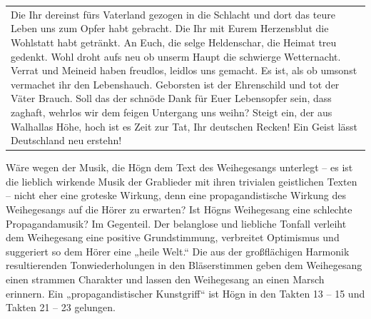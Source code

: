 \documentclass[a4paper]{article}
\begin{document}
\begin{center}
\tablefirsthead{}
\tablehead{}
\tabletail{}
\tablelasttail{}
\begin{supertabular}{m{8.761001cm}}
Die Ihr dereinst fürs Vaterland gezogen in die Schlacht\newline
und dort das teure Leben uns zum Opfer habt gebracht.\newline
Die Ihr mit Eurem Herzensblut die Wohlstatt habt getränkt.\newline
An Euch, die selge Heldenschar, die Heimat treu gedenkt.\newline
\newline
Wohl droht aufs neu ob unserm Haupt die schwierge Wetternacht.\newline
Verrat und Meineid haben freudlos, leidlos uns gemacht.\newline
Es ist, als ob umsonst vermachet ihr den Lebenshauch.\newline
Geborsten ist der Ehrenschild und tot der Väter Brauch.\newline
\newline
Soll das der schnöde Dank für Euer Lebensopfer sein,\newline
dass zaghaft, wehrlos wir dem feigen Untergang uns weihn?\newline
Steigt ein, der aus Walhallas Höhe, hoch ist es Zeit zur Tat,\newline
Ihr deutschen Recken! Ein Geist lässt Deutschland neu erstehn!\\
\end{supertabular}
\end{center}
Wäre wegen der Musik, die Högn dem Text des Weihegesangs unterlegt – es
ist die lieblich wirkende Musik der Grablieder mit ihren trivialen
geistlichen Texten – nicht eher eine groteske Wirkung, denn eine
propagandistische Wirkung des Weihegesangs auf die Hörer zu erwarten?
Ist Högns Weihegesang eine schlechte Propagandamusik? Im Gegenteil. Der
belanglose und liebliche Tonfall verleiht dem Weihegesang eine positive
Grundstimmung, verbreitet Optimismus und suggeriert so dem Hörer eine
„heile Welt.“ Die aus der großflächigen Harmonik resultierenden
Tonwiederholungen in den Bläserstimmen geben dem Weihegesang einen
strammen Charakter und lassen den Weihegesang an einen Marsch erinnern.
Ein „propagandistischer Kunstgriff“ ist Högn in den Takten 13 – 15 und
Takten 21 – 23 gelungen.
\end{document}
